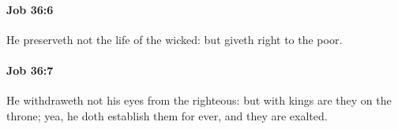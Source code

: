 		\paragraph{Job 36:6} %
			\label{JOB-36-6}

			He preserveth not the life of the wicked: but giveth right to the poor.


		\paragraph{Job 36:7} %
			\label{JOB-36-7}

			He withdraweth not his eyes from the righteous: but with kings are they on the throne; yea, he doth establish them for ever, and they are exalted.


